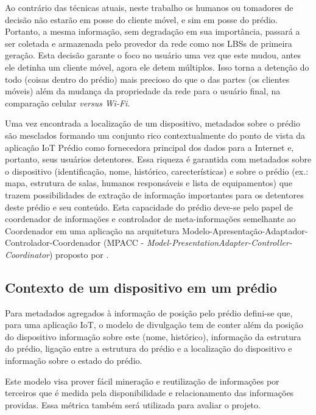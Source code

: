 Ao contrário das técnicas atuais, neste trabalho os humanos ou tomadores de
decisão não estarão em posse do cliente móvel, e sim em posse do prédio.
Portanto, a mesma informação, sem degradação em sua importância, passará a ser
coletada e armazenada pelo provedor da rede como nos LBSs de primeira geração.
Esta decisão garante o foco no usuário uma vez que este mudou, antes ele detinha
um cliente móvel, agora ele detem múltiplos. Isso torna a detenção do todo
(coisas dentro do prédio) mais precioso do que o das partes (os clientes móveis)
além da mudança da propriedade da rede para o usuário final, na comparação
celular \emph{versus} \emph{Wi-Fi}.

Uma vez encontrada a localização de um dispositivo, metadados sobre o prédio são
mesclados formando um conjunto rico contextualmente do ponto de vista da
aplicação IoT Prédio como fornecedora principal dos dados para a Internet e,
portanto, seus usuários detentores. Essa riqueza é garantida com metadados sobre
o dispositivo (identificação, nome, histórico, carecterísticas) e sobre o prédio
(ex.: mapa, estrutura de salas, humanos responsáveis e lista de equipamentos)
que trazem possibilidades de extração de informação importantes para os
detentores deste prédio e seu conteúdo. Esta capacidade do prédio deve-se pelo
papel de coordenador de informações e controlador de meta-informações semelhante
ao Coordenador em uma aplicação na arquitetura
Modelo-Apresentação-Adaptador-Controlador-Coordenador (MPACC -
\emph{Model-PresentationAdapter-Controller-Coordinator}) proposto por
.


\subsection{Contexto de um dispositivo em um prédio}
\label{subsec:Contexto de um dispositivo em um prédio}

Para metadados agregados à informação de posição pelo prédio defini-se que, para
uma aplicação IoT, o modelo de divulgação tem de conter além da posição do
dispositivo informação sobre este (nome, histórico), informação da estrutura do
prédio, ligação entre a estrutura do prédio e a localização do dispositivo e
informação sobre o estado do prédio.


Este modelo visa prover fácil mineração e reutilização de informações por
terceiros que é medida pela disponibilidade e
relacionamento das informações providas. Essa métrica também será utilizada para
avaliar o projeto.

